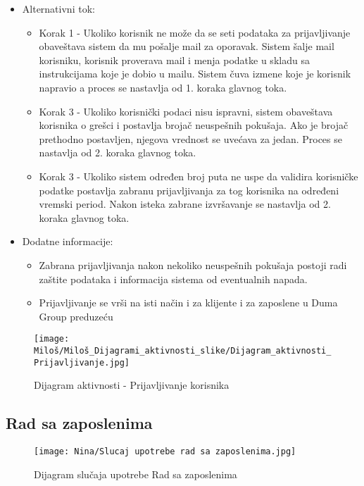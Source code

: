 \documentclass[a4paper]{article}
\begin{document}
\begin{itemize}
\begin{enumerate}
        \end{enumerate}
    \item Alternativni tok:
        \begin{itemize}
            \item Korak 1 - Ukoliko korisnik ne može da se seti podataka za prijavljivanje obaveštava sistem da mu pošalje mail za oporavak. Sistem šalje mail korisniku, korisnik proverava mail i menja podatke u skladu sa instrukcijama koje je dobio u mailu. Sistem čuva izmene koje je korisnik napravio a proces se nastavlja od 1. koraka glavnog toka.
            \item Korak 3 - Ukoliko korisnički podaci nisu ispravni, sistem obaveštava korisnika o grešci i postavlja brojač neuspešnih pokušaja.
            Ako je brojač prethodno postavljen, njegova vrednost se uvećava za jedan. Proces se nastavlja od 2. koraka glavnog toka.
            \item Korak 3 - Ukoliko sistem određen broj puta ne uspe da validira korisničke podatke postavlja zabranu prijavljivanja za tog korisnika na određeni vremski period. Nakon isteka zabrane izvršavanje se nastavlja od 2. koraka glavnog toka.
        \end{itemize}
    \item Dodatne informacije:
        \begin{itemize}
            \item Zabrana prijavljivanja nakon nekoliko neuspešnih pokušaja postoji radi zaštite podataka i informacija sistema od eventualnih napada.
            \item Prijavljivanje se vrši na isti način i za klijente i za zaposlene u Duma Group preduzeću
        \end{itemize}
\end{itemize}


\begin{figure}[htp]
    \centering
    \texttt{[image: Miloš/Miloš\_Dijagrami\_aktivnosti\_slike/Dijagram\_aktivnosti\_Prijavljivanje.jpg]}
    \caption{Dijagram aktivnosti - Prijavljivanje korisnika}
    \label{fig:Prijavljivanje aktivnost}
\end{figure}



\subsection{Rad sa zaposlenima}

\begin{figure}[H]
    \centering
    \texttt{[image: Nina/Slucaj upotrebe rad sa zaposlenima.jpg]}
    \caption{Dijagram slučaja upotrebe Rad sa zaposlenima}
    \label{fig:RegistracijaZ}
\end{figure}
\end{document}
